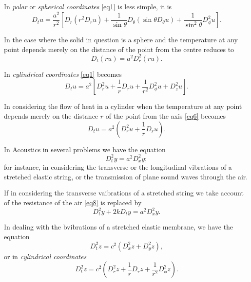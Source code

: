 \documentclass[oneside,12pt]{book}
\begin{document}
In \textit{polar} or \textit{spherical coordinates} \eqref{eq1} is less simple, it is 
\begin{equation}
    D_tu=\frac{a^2}{r^2}\left[D_r(r^2D_ru)+\frac{1}{\sin\theta}D_\theta(\sin\theta D_\theta u)+\frac{1}{\sin^2\theta}D_\phi^2u\right].
    \label{eq4}
\end{equation} \par 
In the case where the solid in question is a sphere and the temperature at any point depends merely on the distance of the point from the centre  reduces to 
\begin{equation}
    \label{eq5}
    D_t(ru)=a^2D_r^2(ru). 
\end{equation} \par 

In \textit{cylindrical coordinates} \eqref{eq1} becomes 
\begin{equation}
    \label{eq6}
    D_tu=a^2[D_r^2u+\frac{1}{r}D_ru+\frac{1}{r^2}D_\phi^2u+D_z^2u].
\end{equation} \par 

In considering the flow of heat in a cylinder when the temperature at any point depends merely on the distance $r$ of the point from the axis \eqref{eq6} becomes 
\begin{equation}
    \label{eq7}
    D_tu=a^2(D_r^2u+\frac{1}{r}D_ru).
\end{equation} \par 
In Acoustics in several problems we have the equation
\begin{equation}
    \label{eq8}
    D_t^2y=a^2D_x^2y;
\end{equation}
for instance, in considering the transverse or the longitudinal vibrations of a stretched elastic string, or the transmission of plane sound waves through the air. \par 

If in considering the transverse vaibrations of a stretched string we take account of the resistance of the air \eqref{eq8} is replaced by 
\begin{equation}
    \label{eq9}
    D_t^2y+2kD_ty=a^2D_x^2y. 
\end{equation} \par 

In dealing with the bvibrations of a stretched elastic membrane, we have the equation 
\begin{equation}
    \label{eq10}
    D_t^2z=c^2(D_x^2z+D_y^2z),
\end{equation}
or in \textit{cylindrical coordinates}
\begin{equation}
    \label{eq11}
    D_t^2z=c^2(D_r^2z+\frac{1}{r}D_rz+\frac{1}{r^2}D_\phi^2z).
\end{equation} \par 
\end{document}
